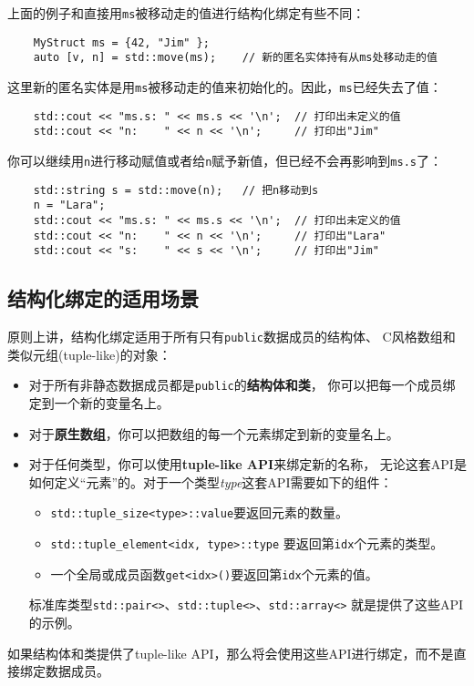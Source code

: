 上面的例子和直接用\texttt{ms}被移动走的值进行结构化绑定有些不同：
\begin{lstlisting}
    MyStruct ms = {42, "Jim" };
    auto [v, n] = std::move(ms);    // 新的匿名实体持有从ms处移动走的值
\end{lstlisting}
这里新的匿名实体是用\texttt{ms}被移动走的值来初始化的。因此，\texttt{ms}已经失去了值：
\begin{lstlisting}
    std::cout << "ms.s: " << ms.s << '\n';  // 打印出未定义的值
    std::cout << "n:    " << n << '\n';     // 打印出"Jim"
\end{lstlisting}
你可以继续用\texttt{n}进行移动赋值或者给\texttt{n}赋予新值，但已经不会再影响到\texttt{ms.s}了：
\begin{lstlisting}
    std::string s = std::move(n);   // 把n移动到s
    n = "Lara";
    std::cout << "ms.s: " << ms.s << '\n';  // 打印出未定义的值
    std::cout << "n:    " << n << '\n';     // 打印出"Lara"
    std::cout << "s:    " << s << '\n';     // 打印出"Jim"
\end{lstlisting}

\subsection{结构化绑定的适用场景}
原则上讲，结构化绑定适用于所有只有\texttt{public}数据成员的结构体、
C风格数组和类似元组(tuple-like)的对象：
\begin{itemize}[leftmargin=*]
    \item 对于所有非静态数据成员都是\texttt{public}的\textbf{结构体和类}，
    你可以把每一个成员绑定到一个新的变量名上。
    \item 对于\textbf{原生数组}，你可以把数组的每一个元素绑定到新的变量名上。
    \item 对于任何类型，你可以使用\textbf{tuple-like API}来绑定新的名称，
    无论这套API是如何定义“元素”的。对于一个类型\emph{type}这套API需要如下的组件：
    \begin{itemize}[leftmargin=*]
        \item \texttt{std::tuple\_size<type>::value}要返回元素的数量。
        \item \texttt{std::tuple\_element<idx, type>::type}
        要返回第\texttt{idx}个元素的类型。
        \item 一个全局或成员函数\texttt{get<idx>()}要返回第\texttt{idx}个元素的值。
    \end{itemize}
    标准库类型\texttt{std::pair<>}、\texttt{std::tuple<>}、\texttt{std::array<>}
    就是提供了这些API的示例。
\end{itemize}
如果结构体和类提供了tuple-like API，那么将会使用这些API进行绑定，而不是直接绑定数据成员。

